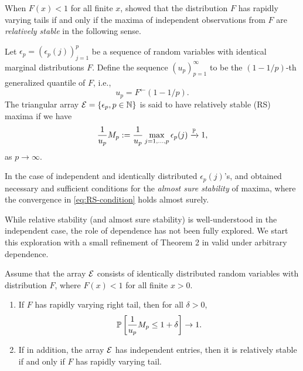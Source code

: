 When $F(x)<1$ for all finite $x$, \citet{gnedenko1943distribution} showed that the distribution $F$ has rapidly varying tails if and only if the maxima of independent observations from $F$ are \emph{relatively stable} in the following sense.
\begin{definition} \label{def:RS}
Let $\epsilon_p = \left(\epsilon_p(j)\right)_{j=1}^p$ be a sequence of random variables with identical marginal distributions $F$. Define the sequence $(u_p)_{p=1}^\infty$ to be the $(1-1/p)$-th generalized quantile of $F$, i.e., 
\begin{equation} \label{eq:quantiles}
    u_p = F^\leftarrow(1 - 1/p).
\end{equation}
The triangular array ${\cal E} = \{\epsilon_p, p\in\mathbb N\}$ is said to have relatively stable (RS) maxima if we have
\begin{equation} \label{eq:RS-condition}
    \frac{1}{u_{p}} M_p := \frac{1}{u_{p}} \max_{j=1,\ldots,p} \epsilon_p(j) \xrightarrow{\P} 1,
\end{equation}
as $p\to\infty$.
\end{definition}

In the case of independent and identically distributed $\epsilon_p(j)$'s, \citet{barndorff1963limit} and \citet{resnick1973almost} obtained necessary and sufficient conditions for the \emph{almost sure stability} of maxima, where the convergence in \eqref{eq:RS-condition} holds almost surely.

While relative stability (and almost sure stability) is well-understood in the independent case, the role of dependence has not been fully explored.
We start this exploration with a small refinement of Theorem 2 in \citet{gnedenko1943distribution} valid under arbitrary dependence.

\begin{proposition} \label{prop:rapid-varying-tails}
Assume that the array ${\cal E}$ consists of identically distributed random 
variables with distribution $F$, where $F(x)<1$ for all finite $x>0$. 
\begin{enumerate}
    \item If $F$ has rapidly varying right tail, then for all $\delta>0$,
        \begin{equation} \label{eq:rapid-varying-tails}
            \P\left[\frac{1}{u_p} M_p\le1+\delta\right] \to 1.
        \end{equation}
    \item If in addition, the array ${\cal E}$ has independent entries, then it is relatively stable if and only if $F$ has rapidly varying tail.
    \label{prop:rapid-varying-tails_part-ii}
\end{enumerate}
\end{proposition}

